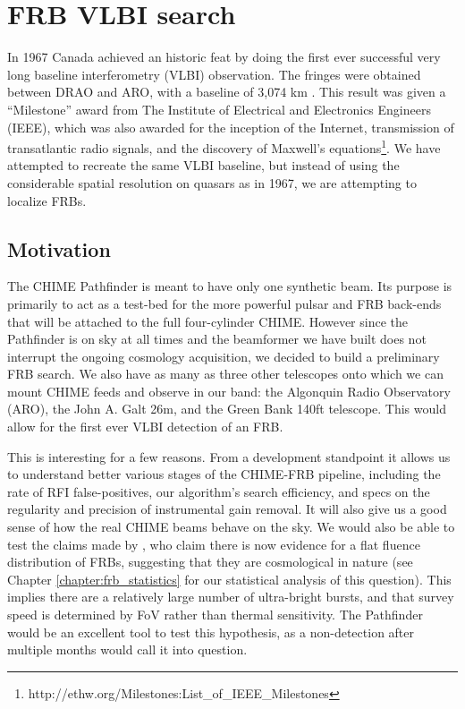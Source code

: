 \section{FRB VLBI search}
\label{vlbi_frb}

In 1967 Canada achieved an historic feat by doing 
the first ever successful very long 
baseline interferometry (VLBI) observation. The fringes were 
obtained between DRAO and ARO, with a baseline of 3,074 km \citep{1967Natur.215...38B}. 
This result was given a ``Milestone'' award from 
The Institute of Electrical and Electronics Engineers (IEEE), 
which was also awarded for the inception of the Internet, transmission 
of transatlantic radio signals, and the discovery of Maxwell's 
equations\footnote{http://ethw.org/Milestones:List\_of\_IEEE\_Milestones}. 
We have attempted to recreate the same VLBI baseline, but instead of 
using the considerable spatial resolution on quasars as in 1967, 
we are attempting to localize FRBs. 


\subsection{Motivation}

The CHIME Pathfinder is meant to have only one synthetic beam. 
Its purpose is primarily to act as a test-bed for the more powerful 
pulsar and FRB back-ends that will be attached to the 
full four-cylinder CHIME. However since the Pathfinder is on 
sky at all times and the beamformer we have built does not 
interrupt the ongoing cosmology acquisition, we decided to 
build a preliminary FRB search. We also have as many as three 
other telescopes onto which we can mount 
CHIME feeds and observe in our band: the Algonquin Radio Observatory (ARO), 
the John A. Galt 26m, and the Green Bank 140ft telescope. This would
allow for the first ever VLBI detection of an FRB. 

This is interesting for a few reasons. From a development 
standpoint it allows us to understand better various stages of the 
CHIME-FRB pipeline, including the rate of 
RFI false-positives, our algorithm's search 
efficiency, and specs on the regularity and precision of instrumental 
gain removal. It will also give us a good sense of how the real CHIME 
beams behave on the sky. We would also be able to test the claims made by
\citet{2016arXiv160606795V}, who claim there is now evidence 
for a flat fluence distribution of FRBs, suggesting 
that they are cosmological in nature 
(see Chapter \ref{chapter:frb_statistics} for our statistical
analysis of this question). 
This implies there are a relatively large number of 
ultra-bright bursts,
and that survey speed is determined by FoV rather than 
thermal sensitivity. The Pathfinder would be an excellent 
tool to test this hypothesis, as a non-detection after multiple months 
would call it into question. 

